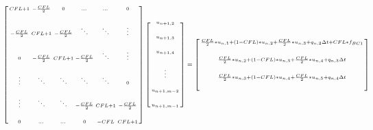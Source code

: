 \documentclass[10pt, letter, showtrims]{extarticle}
\begin{document}
    		\begin{fleqn}
			\begin{equation}
			\label{eq:cnmatrix}
			\hspace*{-1cm}
			\setlength{\arraycolsep}{3pt}
				\begin{medsize}
					\begin{bmatrix}
						\begin{smallmatrix}
							CFL + 1        & - \frac{CFL}{2}  & 0              & \dots           & \dots   & 0                   \\[1.5em]
							-\frac{CFL}{2} & CFL + 1          & -\frac{CFL}{2} & \ddots          & \ddots  & \vdots              \\[1.5em]
							0              & -\frac{CFL}{2}   & CFL + 1        & -\frac{CFL}{2}  & \ddots  & \vdots              \\[1.5em]
							\vdots         & \ddots           & \ddots         & \ddots          & \ddots  & 0                   \\[1.5em]
							\vdots         & \ddots           & \ddots         & -\frac{CFL}{2}  & CFL + 1 & -\frac{CFL}{2}      \\[1.5em]
							0              & \dots            & \dots          & 0               & -CFL    & CFL + 1 \\
						\end{smallmatrix}
					\end{bmatrix}
					\begin{bmatrix}
						\begin{smallmatrix}
							u_{n+1, 2}   \\[1.5em]
							u_{n+1, 3}   \\[1.5em]
							u_{n+1, 4}   \\[1.5em]
							\vdots       \\[1.5em]
							u_{n+1, m-2} \\[1.5em]
							u_{n+1, m-1}
						\end{smallmatrix}
					\end{bmatrix}
					=
					\begin{bmatrix}
						\begin{smallmatrix}
							\frac{CFL}{2} * u_{n, 1} + (1-CFL) * u_{n, 2} + \frac{CFL}{2} * u_{n, 3} + q_{n, 2} \Delta t + CFL * f_{BC1}             \\[1.5em]
							\frac{CFL}{2} * u_{n, 2} + (1-CFL) * u_{n, 3} + \frac{CFL}{2} * u_{n, 4} + q_{n, 3} \Delta t                             \\[1.5em]
							\frac{CFL}{2} * u_{n, 3} + (1-CFL) * u_{n, 4} + \frac{CFL}{2} * u_{n, 5} + q_{n, 4} \Delta t                             \\[1.5em]

\end{smallmatrix}
\end{bmatrix}
\end{medsize}
\end{equation}
\end{fleqn}
\end{document}
